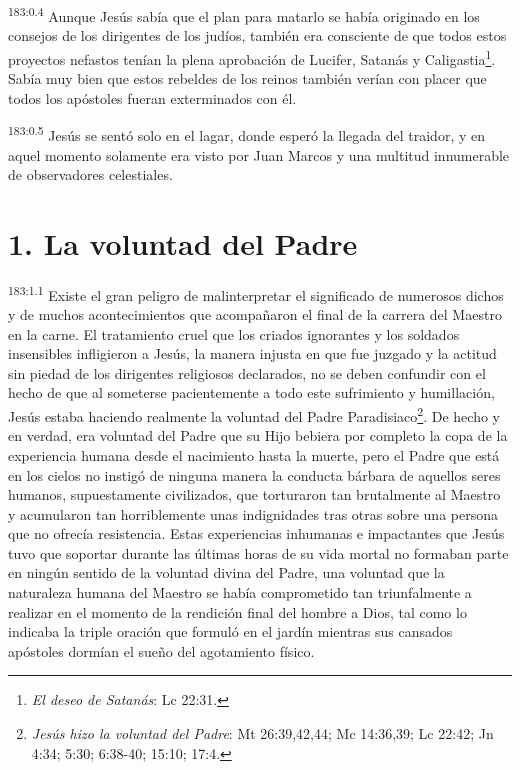 \par
\textsuperscript{183:0.4} Aunque Jesús sabía que el plan para matarlo se había originado en los consejos de los dirigentes de los judíos, también era consciente de que todos estos proyectos nefastos tenían la plena aprobación de Lucifer, Satanás y Caligastia\footnote{\textit{El deseo de Satanás}: Lc 22:31.}. Sabía muy bien que estos rebeldes de los reinos también verían con placer que todos los apóstoles fueran exterminados con él.

\par
\textsuperscript{183:0.5} Jesús se sentó solo en el lagar, donde esperó la llegada del traidor, y en aquel momento solamente era visto por Juan Marcos y una multitud innumerable de observadores celestiales.

\section*{1. La voluntad del Padre}
\par
\textsuperscript{183:1.1} Existe el gran peligro de malinterpretar el significado de numerosos dichos y de muchos acontecimientos que acompañaron el final de la carrera del Maestro en la carne. El tratamiento cruel que los criados ignorantes y los soldados insensibles infligieron a Jesús, la manera injusta en que fue juzgado y la actitud sin piedad de los dirigentes religiosos declarados, no se deben confundir con el hecho de que al someterse pacientemente a todo este sufrimiento y humillación, Jesús estaba haciendo realmente la voluntad del Padre Paradisiaco\footnote{\textit{Jesús hizo la voluntad del Padre}: Mt 26:39,42,44; Mc 14:36,39; Lc 22:42; Jn 4:34; 5:30; 6:38-40; 15:10; 17:4.}. De hecho y en verdad, era voluntad del Padre que su Hijo bebiera por completo la copa de la experiencia humana desde el nacimiento hasta la muerte, pero el Padre que está en los cielos no instigó de ninguna manera la conducta bárbara de aquellos seres humanos, supuestamente civilizados, que torturaron tan brutalmente al Maestro y acumularon tan horriblemente unas indignidades tras otras sobre una persona que no ofrecía resistencia. Estas experiencias inhumanas e impactantes que Jesús tuvo que soportar durante las últimas horas de su vida mortal no formaban parte en ningún sentido de la voluntad divina del Padre, una voluntad que la naturaleza humana del Maestro se había comprometido tan triunfalmente a realizar en el momento de la rendición final del hombre a Dios, tal como lo indicaba la triple oración que formuló en el jardín mientras sus cansados apóstoles dormían el sueño del agotamiento físico.

